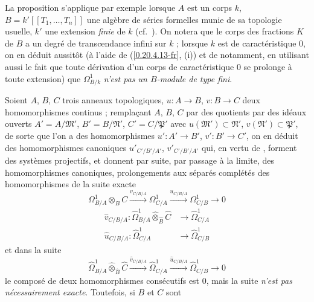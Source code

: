 \begin{env}[20.7.16]
\label{0.20.7.16-fr}
La proposition  s'applique par exemple lorsque $A$ est un
corps $k$, $B=k'[[T_1,\ldots,T_n]]$ une algèbre de séries formelles munie de
sa topologie usuelle, $k'$ une extension \emph{finie} de $k$ (cf.\
). On notera que le corps des fractions $K$ de $B$ a un
degré de transcendance infini sur $k$ ; lorsque $k$ est de caractéristique
$0$, on en déduit aussitôt (à l'aide de (\ref{0.20.4.13-fr}, (i)) et de
\sref{0.20.5.9-fr} notamment, en utilisant aussi le fait que toute dérivation
d'un corps de caractéristique $0$ se prolonge à toute extension) que
$\Omega^1_{B/k}$ \emph{n'est pas un $B$-module de type fini}.
\end{env}

\begin{env}[20.7.17]
\label{0.20.7.17-fr}
Soient $A$, $B$, $C$ trois anneaux topologiques, $u:A\to B$, $v:B\to C$ deux
homomorphismes continus ; remplaçant $A$, $B$, $C$ par des quotients par des
idéaux ouverts $A'=A/\mathfrak{M}'$, $B'=B/\mathfrak{N}'$,
$C'=C/\mathfrak{P}'$ avec $u(\mathfrak{M}')\subset\mathfrak{N}'$,
$v(\mathfrak{N}')\subset\mathfrak{P}'$, de sorte que l'on a des
homomorphismes $u':A'\to B'$, $v':B'\to C'$, on en déduit des homomorphismes
canoniques $u'_{C'/B'/A'}$, $v'_{C'/B'/A'}$ qui, en vertu de
, forment des systèmes projectifs, et donnent par suite,
par passage à la limite, des homomorphismes canoniques, prolongements aux
séparés complétés des homomorphismes de la suite exacte
\[
  \Omega^1_{B/A}\otimes_B C\xrightarrow{v_{C/B/A}}\Omega^1_{C/A}
  \xrightarrow{u_{C/B/A}}\Omega^1_{C/B}\to0
\]
\begin{align}
  \widehat v_{C/B/A}:\widehat{\Omega}^1_{B/A}
  \widehat\otimes_{\widehat B}\widehat C&\to\widehat{\Omega}^1_{C/A}
  \tag{20.7.17.1}\label{0.20.7.17.1-fr}\\
  \widehat u_{C/B/A}:\widehat{\Omega}^1_{C/A}&\to
  \widehat{\Omega}^1_{C/B} \tag{20.7.17.2}\label{0.20.7.17.2-fr}
\end{align}
et dans la suite
\begin{equation}
\tag{20.7.17.3}
\label{0.20.7.17.3-fr}
  \widehat{\Omega}^1_{B/A}\widehat\otimes_{\widehat B}\widehat C
  \xrightarrow{\widehat v_{C/B/A}}\widehat{\Omega}^1_{C/A}
  \xrightarrow{\widehat u_{C/B/A}}\widehat{\Omega}^1_{C/B}\to0
\end{equation}
le composé de deux homomorphismes consécutifs est $0$, mais la suite
\emph{n'est pas nécessairement exacte}. Toutefois, si $B$ et $C$ sont

\end{env}
